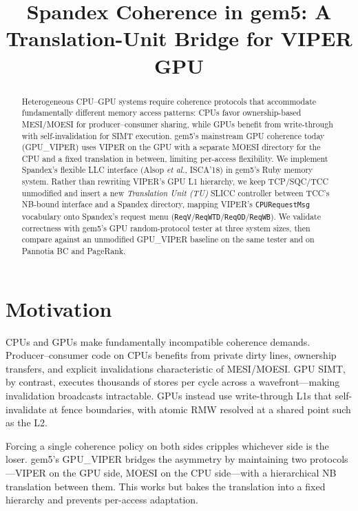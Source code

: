 \documentclass[conference,letterpaper,10pt]{IEEEtran}
\title{Spandex Coherence in gem5: A Translation-Unit Bridge for VIPER GPU}
\author{
\IEEEauthorblockN{Rohan Rao, Tanya, Shao-Kai, Yash, Mohith}
\IEEEauthorblockA{Department of Electrical and Computer Engineering\\
University of Wisconsin--Madison\\
\{rrao8, \ldots\}@wisc.edu}}
\begin{document}
\maketitle

\begin{abstract}
Heterogeneous CPU--GPU systems require coherence protocols that
accommodate fundamentally different memory access patterns: CPUs favor
ownership-based MESI/MOESI for producer--consumer sharing, while GPUs
benefit from write-through with self-invalidation for SIMT execution.
gem5's mainstream GPU coherence today (GPU\_VIPER) uses VIPER on the GPU
with a separate MOESI directory for the CPU and a fixed translation in
between, limiting per-access flexibility.
We implement Spandex's flexible LLC interface (Alsop \emph{et al.},
ISCA'18) in gem5's Ruby memory system. Rather than rewriting VIPER's
GPU L1 hierarchy, we keep TCP/SQC/TCC unmodified and insert a new
\emph{Translation Unit (TU)} SLICC controller between TCC's
\textsc{NB}-bound interface and a Spandex directory, mapping VIPER's
\texttt{CPURequestMsg} vocabulary onto Spandex's request menu
(\texttt{ReqV}/\texttt{ReqWTD}/\texttt{ReqOD}/\texttt{ReqWB}).
We validate correctness with gem5's GPU random-protocol tester at three
system sizes, then compare against an unmodified GPU\_VIPER baseline on
the same tester and on Pannotia BC and PageRank.
\end{abstract}

\section{Motivation}

CPUs and GPUs make fundamentally incompatible coherence demands.
Producer--consumer code on CPUs benefits from private dirty lines,
ownership transfers, and explicit invalidations characteristic of
MESI/MOESI. GPU SIMT, by contrast, executes thousands of stores per
cycle across a wavefront---making invalidation broadcasts intractable.
GPUs instead use write-through L1s that self-invalidate at fence
boundaries, with atomic RMW resolved at a shared point such as the L2.

Forcing a single coherence policy on both sides cripples whichever side
is the loser. gem5's GPU\_VIPER bridges the asymmetry by maintaining
two protocols---VIPER on the GPU side, MOESI on the CPU side---with a
hierarchical \textsc{NB} translation between them. This works but bakes
the translation into a fixed hierarchy and prevents per-access
adaptation.
\end{document}
